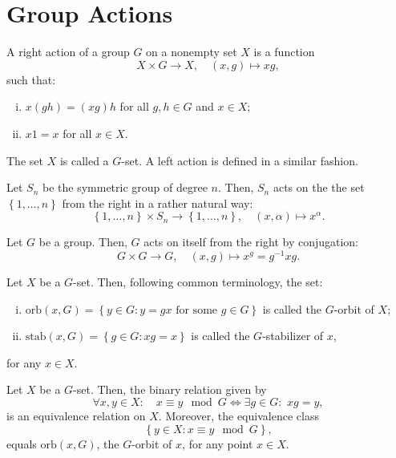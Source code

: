 \section{Group Actions}\label{sec:group-actions}

\begin{definition}\label{def:group-action}
  A right action of a group \(G\) on a nonempty set \(X\) is a function
  \[
    X\times{G}\to{X},\quad(x,g)\mapsto{xg},
  \]
  such that:
  \begin{enumerate}[i.]
    \item
      \(x(gh)=(xg)h\) for all \(g,h\in{G}\) and \(x\in{X}\);
    \item
      \(x1=x\) for all \(x\in{X}\).
  \end{enumerate}
  The set \(X\) is called a \(G\)-set. A left action is defined in a similar
  fashion.
\end{definition}

\begin{example}\label{ex:action-of-symmetric-groups}
  Let \(S_{n}\) be the symmetric group of degree \(n\). Then, \(S_{n}\) acts on
  the the set \(\left\{1,\ldots,n\right\}\) from the right in a rather natural
  way:
  \[
    \left\{1,\ldots,n\right\}\times{S_{n}}\to\left\{1,\ldots,n\right\},
    \quad
    (x,\alpha)\mapsto{x^{\alpha}}.
  \]
\end{example}

\begin{example}\label{ex:conjugation}
  Let \(G\) be a group. Then, \(G\) acts on itself from the right by conjugation:
  \[
    G\times{G}\to{G},\quad(x,g)\mapsto{x^{g}=g^{-1}xg}.
  \]
\end{example}

\begin{definition}\label{def:orbits-and-stabilizers}
  Let \(X\) be a \(G\)-set. Then, following common terminology, the set:
  \begin{enumerate}[i.]
    \item
      \(\text{orb}(x,G)=\left\{y\in{G}:y=gx\text{ for some }g\in{G}\right\}\) is called the
      \(G\)-orbit of \(X\);
    \item
      \(\text{stab}(x,G)=\left\{g\in{G}:xg=x\right\}\) is called the \(G\)-stabilizer of
      \(x\),
  \end{enumerate}
  for any \(x\in{X}\).
\end{definition}

\begin{proposition}\label{prop:orbit-decomposition-of-g-sets}
  Let \(X\) be a \(G\)-set. Then, the binary relation given by
  \begin{equation}\label{eq:g-equivalent-points}
    \forall{x,y\in{X}}:
    \quad
    x\equiv{y}\mod{G}
    \iff
    \exists{g\in{G}}:
    \,\,
    xg=y,
  \end{equation}
  is an equivalence relation on \(X\). Moreover, the equivalence class
  \[
    \left\{y\in{X}:x\equiv{y}\mod{G}\right\},
  \]
  equals \(\text{orb}(x,G)\), the \(G\)-orbit of \(x\), for any point \(x\in{X}\).
\end{proposition}

